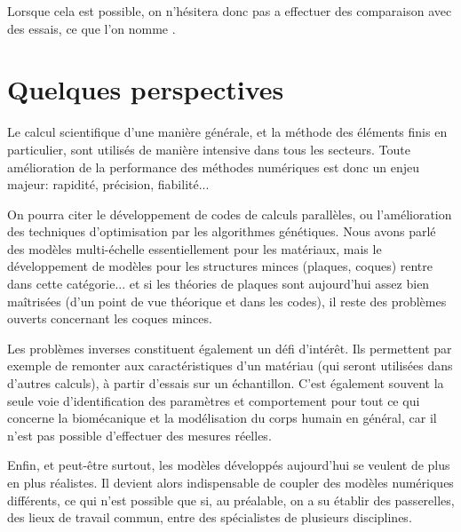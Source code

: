 Lorsque cela est possible, on n'hésitera donc pas a effectuer des comparaison avec des essais, ce que l'on nomme .



\medskip
\section*{Quelques perspectives}

Le calcul scientifique d'une manière générale, et la méthode des éléments finis en particulier, sont utilisés de manière intensive dans tous les secteurs.
\medskipvm
Toute amélioration de la performance des méthodes numériques est donc un enjeu majeur: rapidité, précision, fiabilité...

On pourra citer le développement de codes de calculs parallèles, ou l'amélioration des techniques d'optimisation par les algorithmes génétiques.
\medskipvm
Nous avons parlé des modèles multi-échelle essentiellement pour les matériaux, mais le développement de modèles pour les structures minces (plaques, coques) rentre dans cette catégorie... et si les théories de plaques sont aujourd'hui assez bien maîtrisées (d'un point de vue théorique et dans les codes), il reste des problèmes ouverts concernant les coques minces.

\medskip
Les problèmes inverses constituent également un défi d'intérêt. Ils permettent par exemple de remonter aux caractéristiques d'un matériau (qui seront utilisées dans d'autres calculs), à partir d'essais sur un échantillon.
C'est également souvent la seule voie d'identification des paramètres et comportement pour tout ce qui concerne la biomécanique et la modélisation du corps humain en général, car il n'est pas possible d'effectuer des mesures réelles.

\medskip
Enfin, et peut-être surtout, les modèles développés aujourd'hui se veulent de plus en plus réalistes. Il devient alors indispensable de coupler des modèles numériques différents, ce qui n'est possible que si, au préalable, on a su établir des passerelles, des lieux de travail commun, entre des spécialistes de plusieurs disciplines.

\medskip
